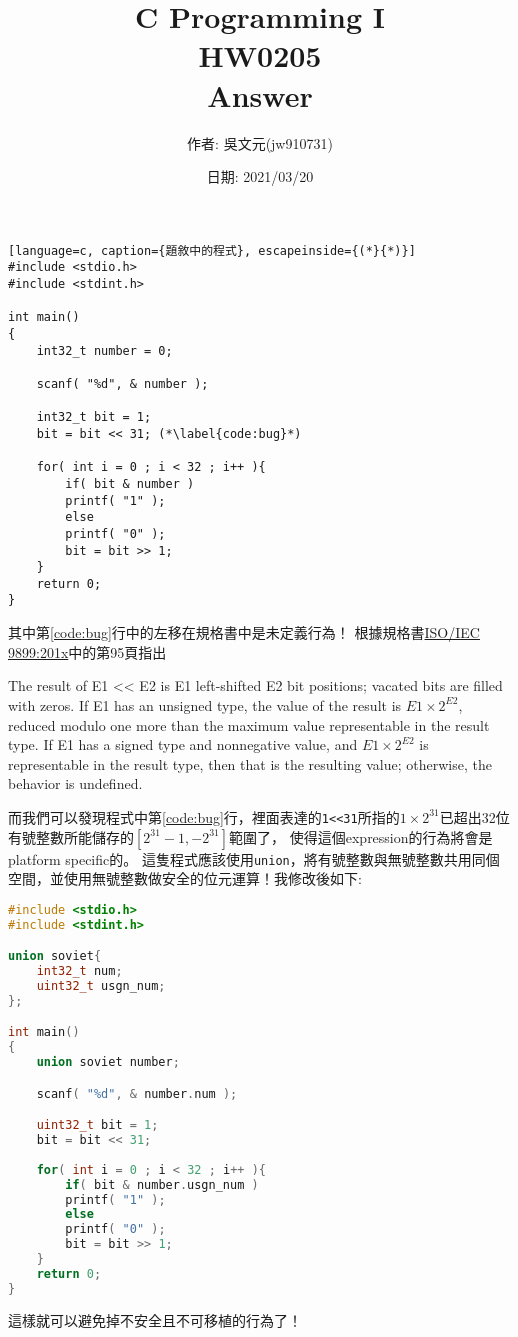\documentclass[a4paper,10pt]{article}
\title{C Programming I\\HW0205\\Answer}
\author{作者: 吳文元(jw910731)}
\date{日期: 2021/03/20}
\begin{document}
\maketitle
\begin{lstlisting}[language=c, caption={題敘中的程式}, escapeinside={(*}{*)}]
#include <stdio.h>
#include <stdint.h>

int main()
{
    int32_t number = 0;

    scanf( "%d", & number );

    int32_t bit = 1;
    bit = bit << 31; (*\label{code:bug}*)
    
    for( int i = 0 ; i < 32 ; i++ ){
        if( bit & number )
        printf( "1" );
        else
        printf( "0" );
        bit = bit >> 1;
    }
    return 0;
}
\end{lstlisting}
其中第\ref{code:bug}行中的左移在規格書中是未定義行為！
根據規格書\href{https://drive.google.com/file/d/1BGSbEazY5azERlFtP9DfmTTHgj-0AjY7/view}{ISO/IEC 9899:201x}中的第95頁指出
\begin{displayquote}
The result of E1 << E2 is E1 left-shifted E2 bit positions; vacated bits are filled with
zeros. If E1 has an unsigned type, the value of the result is \(E1 × 2^{E2}\), reduced modulo
one more than the maximum value representable in the result type. If E1 has a signed
type and nonnegative value, and \(E1 × 2^{E2}\) is representable in the result type, then that is
the resulting value; otherwise, the behavior is undefined.
\end{displayquote}
而我們可以發現程式中第\ref{code:bug}行，裡面表達的\lstinline{1<<31}所指的\(1\times 2^{31}\)已超出32位有號整數所能儲存的\([2^{31}-1, -2^{31}]\)範圍了，
使得這個expression的行為將會是platform specific的。
\newpage
這隻程式應該使用\lstinline{union}，將有號整數與無號整數共用同個空間，並使用無號整數做安全的位元運算！我修改後如下:

\begin{lstlisting}[language=c, caption={修改後的的程式}]
#include <stdio.h>
#include <stdint.h>

union soviet{
    int32_t num;
    uint32_t usgn_num;
};

int main()
{
    union soviet number;

    scanf( "%d", & number.num );

    uint32_t bit = 1;
    bit = bit << 31;
    
    for( int i = 0 ; i < 32 ; i++ ){
        if( bit & number.usgn_num )
        printf( "1" );
        else
        printf( "0" );
        bit = bit >> 1;
    }
    return 0;
}
\end{lstlisting}
這樣就可以避免掉不安全且不可移植的行為了！
\end{document}

